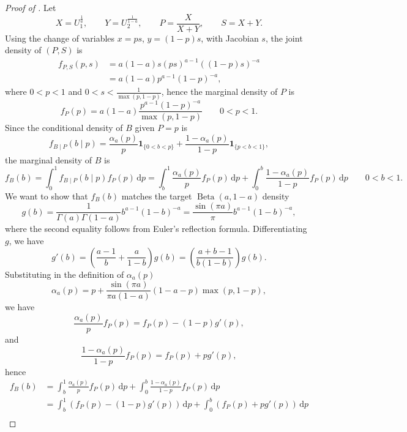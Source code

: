 \documentclass[11pt]{article}
\theoremstyle{plain}
\theoremstyle{remark}
\begin{document}
\begin{proof}[Proof of ]
Let
\[
  X=U_1^{\frac{1}{a}},
  \qquad
  Y=U_2^{\frac{1}{1-a}},
  \qquad
  P=\frac{X}{X+Y},
  \qquad
  S=X+Y.
\]
Using the change of variables $x=ps$, $y=(1-p)s$, with Jacobian $s$, the joint density of $(P,S)$ is
\[
  \begin{aligned}
    f_{P,S}(p,s)
      &= a(1-a)s(ps)^{a-1}((1-p)s)^{-a} \\
      &= a(1-a)p^{a-1}(1-p)^{-a},
  \end{aligned}
\]
where $0<p<1$ and $0<s<\frac{1}{\max(p,1-p)}$, hence the marginal density of $P$ is
\begin{equation}
f_P(p)= a(1-a)\frac{p^{a-1}(1-p)^{-a}}{\max(p,1-p)}
\qquad 0<p<1.
\label{eq:fp-marginal}
\end{equation}
Since the conditional density of $B$ given $P=p$ is
\[
 f_{B \mid P}(b \mid p) = \frac{\alpha_a(p)}{p}\mathbf{1}_{\{0<b<p\}} + \frac{1-\alpha_a(p)}{1-p}\mathbf{1}_{\{p<b<1\}},
\]
the marginal density of $B$ is 
\begin{equation}
f_B(b)= \int_0^1 f_{B \mid P}(b \mid p)f_P(p)\,\mathrm{d}p = \int_b^1 \frac{\alpha_a(p)}{p}f_P(p)\,\mathrm{d}p + \int_0^b\frac{1-\alpha_a(p)}{1-p}f_P(p)\,\mathrm{d}p
\qquad 0<b<1.
\label{eq:fb-marginal}
\end{equation}
We want to show that $f_B(b)$ matches the target $\operatorname{Beta}(a,1-a)$ density
\begin{equation}
g(b) = \frac{1}{\Gamma(a)\Gamma(1-a)}b^{a-1}(1-b)^{-a} = \frac{\sin(\pi a)}{\pi}b^{a-1}(1-b)^{-a},
\label{eq:beta-density}
\end{equation}
where the second equality follows from Euler's reflection formula.
Differentiating $g$, we have
\begin{equation}
  g'(b)= \left(\frac{a-1}{b}+\frac{a}{1-b}\right)g(b)= \left(\frac{a+b-1}{b(1-b)}\right)g(b).
\label{eq:beta-deriv}
\end{equation}
	Substituting in the definition of $\alpha_a(p)$
\[
  \alpha_a(p) = p + \frac{\sin(\pi a)}{\pi a(1-a)}(1-a-p)\max(p,1-p),
\]
we have
\[
 \frac{\alpha_a(p)}{p}f_P(p) = f_P(p)-(1-p)g'(p),
\]
and 
\[
 \frac{1-\alpha_a(p)}{1-p}f_P(p) = f_P(p)+pg'(p),
\]
hence
\[
\begin{aligned}
f_B(b) &= \int_b^1 \frac{\alpha_a(p)}{p}f_P(p)\,\mathrm{d}p + \int_0^b\frac{1-\alpha_a(p)}{1-p}f_
P(p)\,\mathrm{d}p \\
&= \int_b^1\left(f_P(p) - (1-p)g'(p)\right)\,\mathrm{d}p + \int_0^b\left(f_P(p) + pg'(p)\right)\,\mathrm{d}p \\

\end{aligned}\]
\end{proof}
\end{document}
